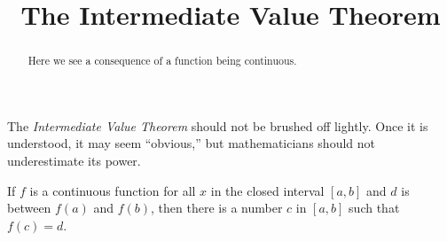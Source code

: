 \documentclass{ximera}
\title[Dig-In:]{The Intermediate Value Theorem}
\begin{document}
\begin{abstract}
  Here we see a consequence of a function being continuous.
\end{abstract}
\maketitle



The \textit{Intermediate Value Theorem} should not be brushed off
lightly. Once it is understood, it may seem ``obvious,'' but
mathematicians should not underestimate its power.

\begin{theorem}\label{theorem:IVT}
If $f$ is a continuous function for all $x$ in the closed interval
$[a,b]$ and $d$ is between $f(a)$ and $f(b)$, then there is a number
$c$ in $[a, b]$ such that $f(c) = d$.
\end{theorem}

\end{document}
